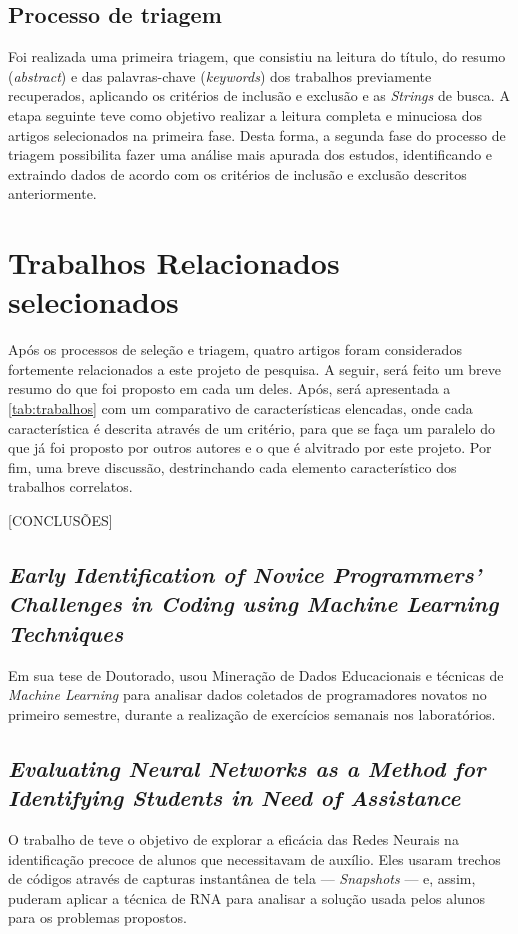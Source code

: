 \subsection{Processo de triagem}
Foi realizada uma primeira triagem, que consistiu na leitura do título, do resumo (\textit{abstract}) e das palavras-chave (\textit{keywords}) dos trabalhos previamente recuperados, aplicando os critérios de inclusão e exclusão e as \textit{Strings} de busca.
A etapa seguinte teve como objetivo realizar a leitura completa e minuciosa dos artigos selecionados na primeira fase. Desta forma, a segunda fase do processo de triagem possibilita fazer uma análise mais apurada dos estudos, identificando e extraindo dados de acordo com os critérios de inclusão e exclusão descritos anteriormente.

\section{Trabalhos Relacionados selecionados}
Após os processos de seleção e triagem, quatro artigos foram considerados fortemente relacionados a este projeto de pesquisa. A seguir, será feito um breve resumo do que foi proposto em cada um deles. Após, será apresentada a \autoref{tab:trabalhos} com um comparativo de características elencadas, onde cada característica é descrita através de um critério, para que se faça um paralelo do que já foi proposto por outros autores e o que é alvitrado por este projeto. Por fim, uma breve discussão, destrinchando cada elemento característico dos trabalhos correlatos.

{\color{red} [CONCLUSÕES]}

\subsection{\textit{Early Identification of Novice Programmers' Challenges in Coding using Machine Learning Techniques}} \label{sec:Early}
Em sua tese de Doutorado,  usou Mineração de Dados Educacionais e técnicas de \textit{Machine Learning} para analisar dados coletados de programadores novatos no primeiro semestre, durante a realização de exercícios semanais nos laboratórios.

\subsection{\textit{Evaluating Neural Networks as a Method for Identifying Students in Need of Assistance}} \label{sec:Evaluating}
O trabalho de  teve o objetivo de explorar a eficácia das Redes Neurais na identificação precoce de alunos que necessitavam de auxílio. Eles usaram trechos de códigos através de capturas instantânea de tela --- \textit{Snapshots} --- e, assim, puderam aplicar a técnica de RNA para analisar a solução usada pelos alunos para os problemas propostos.

